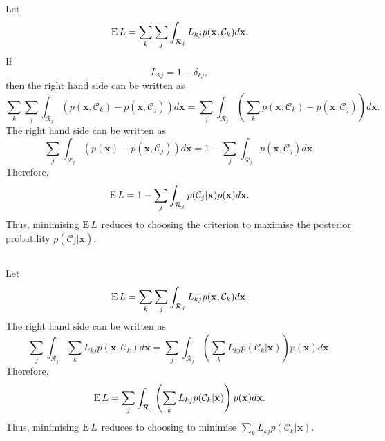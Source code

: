 \subsection{}
\label{1.22}
Let
%
\begin{equation}
\operatorname{E} L 
= 
\sum_{k} 
\sum_{j} 
\int_{\mathcal{R}_j} L_{kj} 
p(\mathbf{x}, \mathcal{C}_k) 
d\mathbf{x}.
\end{equation}
%
If
%
\begin{equation}
L_{kj} 
= 
1 
- 
\delta_{kj},
\end{equation}
%
then the right hand side can be written as
%
\begin{equation}
\sum_{k} \sum_{j} 
\int_{\mathcal{R}_j} 
\left( 
	p(\mathbf{x}, \mathcal{C}_k) 
	- 
	p(\mathbf{x}, \mathcal{C}_j) 
\right)  
d\mathbf{x} 
= 
\sum_{j} 
\int_{\mathcal{R}_j} 
\left( 
	\sum_{k} 
	p(\mathbf{x}, \mathcal{C}_k) 
	- 
	p(\mathbf{x}, \mathcal{C}_j) 
\right)  
d\mathbf{x}.
\end{equation}
%
The right hand side can be written as
%
\begin{equation}
\sum_{j} 
\int_{\mathcal{R}_j} 
\left( 
	p(\mathbf{x}) 
	- 
	p(\mathbf{x}, \mathcal{C}_j) 
\right)  
d\mathbf{x} 
= 
1 
- 
\sum_{j} 
\int_{\mathcal{R}_j} 
p(\mathbf{x}, \mathcal{C}_j) 
d\mathbf{x}.
\end{equation}
%
Therefore,
%
\begin{equation}
\operatorname{E} L 
= 
1 
- 
\sum_{j} 
\int_{\mathcal{R}_j}
p(\mathcal{C}_j | \mathbf{x}) 
p(\mathbf{x}) 
d\mathbf{x}.
\end{equation}
%
Thus, minimising $\operatorname{E} L$ reduces to choosing the criterion to maximise the posterior probatility $p(\mathcal{C}_j | \mathbf{x})$.


\subsection{}
\label{1.23}
Let
%
\begin{equation}
\operatorname{E} L 
= 
\sum_{k} 
\sum_{j} 
\int_{\mathcal{R}_j} 
L_{kj} 
p(\mathbf{x}, \mathcal{C}_k) 
d\mathbf{x}.
\end{equation}
%
The right hand side can be written as
%
\begin{equation}
\sum_{j} 
\int_{\mathcal{R}_j} 
\sum_{k} 
L_{kj} 
p(\mathbf{x}, \mathcal{C}_k) 
d\mathbf{x} 
= 
\sum_{j} 
\int_{\mathcal{R}_j} 
\left( 
	\sum_{k} 
	L_{kj} 
	p(\mathcal{C}_k | \mathbf{x}) 
\right) 
p(\mathbf{x}) 
d\mathbf{x}.
\end{equation}
%
Therefore,
%
\begin{equation}
\operatorname{E} L 
= 
\sum_{j} 
\int_{\mathcal{R}_j} 
\left( 
	\sum_{k} 
	L_{kj} 
	p(\mathcal{C}_k | \mathbf{x}) 
\right) 
p(\mathbf{x}) 
d\mathbf{x}.
\end{equation}
%
Thus, minimising $\operatorname{E} L$ reduces to choosing to minimise $\sum_{k} L_{kj} p(\mathcal{C}_k | \mathbf{x})$.


